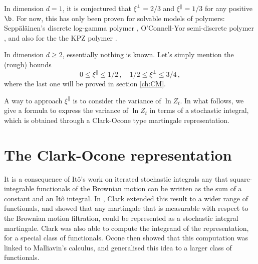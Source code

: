 In dimension $d=1$, it is conjectured that $\xi^{\perp}=2/3$ and $\xi^{\parallel}=1/3$ for any positive $\b$. For now, this has only been proven for solvable models of polymers: Sepp\"al\"ainen's discrete log-gamma polymer \cite{Sepp12}, O'Connell-Yor semi-discrete polymer \cite{MorenoSeppValko,SeppValko10}, and also for the the KPZ polymer \cite{BalaszQuastelSeppalainen11}. 


In dimension $d \geq 2$, essentially nothing is known. Let's simply mention the (rough) bounds
$$
0 \leq \xi^\parallel \leq 1/2\,,\quad 1/2 \leq \xi^\perp \leq 3/4\,,
$$
where the last one will be proved in section \ref{ch:CM}.

A way to approach $\xi^{\parallel}$ is to consider the variance of  $\ln Z_t$.
In what follows, we give a formula to express the variance of $\ln Z_t$ in terms of a stochastic integral, which is obtained through a Clark-Ocone type martingale representation.

\section{The Clark-Ocone representation}
It is a consequence of It\^o's work on iterated stochastic integrals \cite{ito1951multiple} any that square-integrable functionals of the Brownian motion can be written as the sum of a constant and an It\^o integral. In \cite{clark1970representation}, Clark extended this result to a wider range of functionals, and showed that any martingale that is measurable with respect to the Brownian motion filtration, could be represented as a stochastic integral martingale. Clark was also able to compute the integrand of the representation, for a special class of functionals. Ocone then showed \cite{ocone1984malliavin} that this computation was linked to Malliavin's calculus, and generalised this idea to a larger class of functionals.

